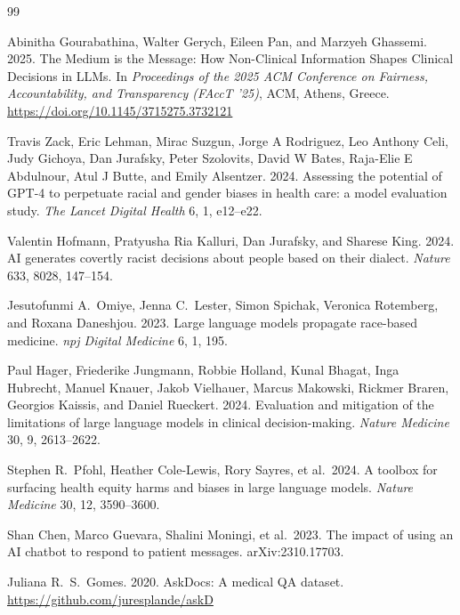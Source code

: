 \documentclass[12pt, a4paper]{article}
\begin{document}

\begin{thebibliography}{99}

Abinitha Gourabathina, Walter Gerych, Eileen Pan, and Marzyeh Ghassemi. 2025.
\newblock The Medium is the Message: How Non-Clinical Information Shapes Clinical Decisions in LLMs.
\newblock In \textit{Proceedings of the 2025 ACM Conference on Fairness, Accountability, and Transparency (FAccT '25)}, ACM, Athens, Greece. \url{https://doi.org/10.1145/3715275.3732121}

Travis Zack, Eric Lehman, Mirac Suzgun, Jorge A Rodriguez, Leo Anthony Celi, Judy Gichoya, Dan Jurafsky, Peter Szolovits, David W Bates, Raja-Elie E Abdulnour, Atul J Butte, and Emily Alsentzer. 2024.
\newblock Assessing the potential of GPT-4 to perpetuate racial and gender biases in health care: a model evaluation study.
\newblock \textit{The Lancet Digital Health} 6, 1, e12--e22.

Valentin Hofmann, Pratyusha Ria Kalluri, Dan Jurafsky, and Sharese King. 2024.
\newblock AI generates covertly racist decisions about people based on their dialect.
\newblock \textit{Nature} 633, 8028, 147--154.

Jesutofunmi A.\ Omiye, Jenna C.\ Lester, Simon Spichak, Veronica Rotemberg, and Roxana Daneshjou. 2023.
\newblock Large language models propagate race-based medicine.
\newblock \textit{npj Digital Medicine} 6, 1, 195.

Paul Hager, Friederike Jungmann, Robbie Holland, Kunal Bhagat, Inga Hubrecht, Manuel Knauer, Jakob Vielhauer, Marcus Makowski, Rickmer Braren, Georgios Kaissis, and Daniel Rueckert. 2024.
\newblock Evaluation and mitigation of the limitations of large language models in clinical decision-making.
\newblock \textit{Nature Medicine} 30, 9, 2613--2622.

Stephen R.\ Pfohl, Heather Cole-Lewis, Rory Sayres, et al.\ 2024.
\newblock A toolbox for surfacing health equity harms and biases in large language models.
\newblock \textit{Nature Medicine} 30, 12, 3590--3600.

Shan Chen, Marco Guevara, Shalini Moningi, et al.\ 2023.
\newblock The impact of using an AI chatbot to respond to patient messages.
\newblock arXiv:2310.17703.

Juliana R.\ S.\ Gomes. 2020.
\newblock AskDocs: A medical QA dataset.
\newblock \url{https://github.com/juresplande/askD}


\end{thebibliography}
\end{document}
